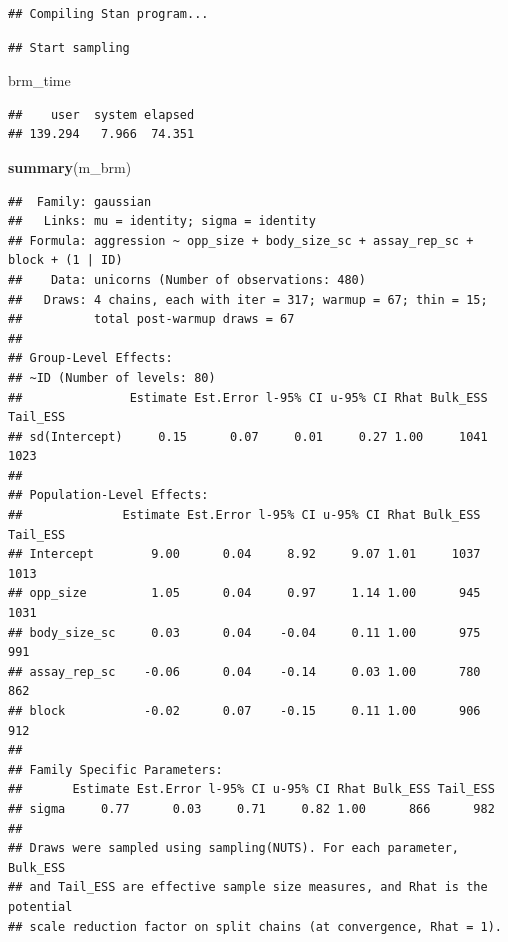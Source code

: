 \documentclass[
  12pt,
]{book}
\newenvironment{Shaded}{\begin{snugshade}}{\end{snugshade}}
\newcommand{\KeywordTok}[1]{\textcolor[rgb]{0.13,0.29,0.53}{\textbf{#1}}}
\newcommand{\NormalTok}[1]{#1}
\begin{document}
\begin{verbatim}
## Compiling Stan program...
\end{verbatim}

\begin{verbatim}
## Start sampling
\end{verbatim}

\begin{Shaded}
\begin{Highlighting}[]
\NormalTok{brm\_time}
\end{Highlighting}
\end{Shaded}

\begin{verbatim}
##    user  system elapsed 
## 139.294   7.966  74.351
\end{verbatim}

\begin{Shaded}
\begin{Highlighting}[]
\KeywordTok{summary}\NormalTok{(m\_brm)}
\end{Highlighting}
\end{Shaded}

\begin{verbatim}
##  Family: gaussian 
##   Links: mu = identity; sigma = identity 
## Formula: aggression ~ opp_size + body_size_sc + assay_rep_sc + block + (1 | ID) 
##    Data: unicorns (Number of observations: 480) 
##   Draws: 4 chains, each with iter = 317; warmup = 67; thin = 15;
##          total post-warmup draws = 67
## 
## Group-Level Effects: 
## ~ID (Number of levels: 80) 
##               Estimate Est.Error l-95% CI u-95% CI Rhat Bulk_ESS Tail_ESS
## sd(Intercept)     0.15      0.07     0.01     0.27 1.00     1041     1023
## 
## Population-Level Effects: 
##              Estimate Est.Error l-95% CI u-95% CI Rhat Bulk_ESS Tail_ESS
## Intercept        9.00      0.04     8.92     9.07 1.01     1037     1013
## opp_size         1.05      0.04     0.97     1.14 1.00      945     1031
## body_size_sc     0.03      0.04    -0.04     0.11 1.00      975      991
## assay_rep_sc    -0.06      0.04    -0.14     0.03 1.00      780      862
## block           -0.02      0.07    -0.15     0.11 1.00      906      912
## 
## Family Specific Parameters: 
##       Estimate Est.Error l-95% CI u-95% CI Rhat Bulk_ESS Tail_ESS
## sigma     0.77      0.03     0.71     0.82 1.00      866      982
## 
## Draws were sampled using sampling(NUTS). For each parameter, Bulk_ESS
## and Tail_ESS are effective sample size measures, and Rhat is the potential
## scale reduction factor on split chains (at convergence, Rhat = 1).
\end{verbatim}
\end{document}
